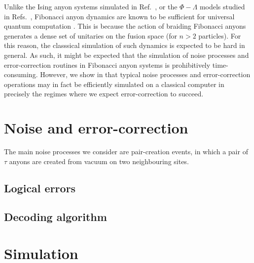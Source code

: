 \documentclass[aps, pra, a4paper, 11pt, nofootinbib, superscriptaddress, tightenlines, 
notitlepage, longbibliography]{revtex4}
\begin{document}
	Unlike the Ising anyon systems simulated in Ref.~\cite{Brell2013}, or the $\Phi-\Lambda$ models studied in Refs.~\cite{Wootton2013,Hutter2014}, Fibonacci anyon dynamics are known to be sufficient for universal quantum computation \cite{Freedman2002}. This is because the action of braiding Fibonacci anyons generates a dense set of unitaries on the fusion space (for $n>2$ particles). For this reason, the classsical simulation of such dynamics is expected to be hard in general. As such, it might be expected that the simulation of noise processes and error-correction routines in Fibonacci anyon systems is prohibitively time-consuming. However, we show in  that typical noise processes and error-correction operations may in fact be efficiently simulated on a classical computer in precisely the regimes where we expect error-correction to succeed.
	


\section{Noise and error-correction}\label{s:noise}

	The main noise processes we consider are pair-creation events, in which a pair of $\tau$ anyons are created from vacuum on two neighbouring sites.
	

	\subsection{Logical errors}
		

	\subsection{Decoding algorithm}
	

	
	
\section{Simulation}\label{s:sim}
\end{document}
